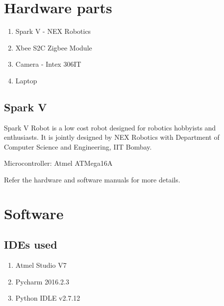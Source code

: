 \documentclass[main.tex]{subfiles}
\begin{document}
	\section{Hardware parts}
	\begin{enumerate}
		\item Spark V - NEX Robotics
		\item Xbee S2C Zigbee Module
		\item Camera - Intex 306IT 
		\item Laptop
	\end{enumerate}
	
	\subsection*{Spark V}
	\begin{flushleft}
		Spark V Robot \href{http://www.nex-robotics.com/products/spark-v-robot/spark-v.html}{\ExternalLink} is a low cost robot designed for robotics hobbyists and enthusiasts. It is jointly designed by NEX Robotics with Department of Computer Science and Engineering, IIT Bombay.
		
		Microcontroller: Atmel ATMega16A
		
		Refer the hardware \href{./datasheet/Spark V manuals/SPARK V ATMEGA16 Hardware Manual 2010-11-06.pdf}{\ExternalLink} and software\href{./datasheet/Spark V manuals/SPARK V ATMEGA16 Hardware Manual 2010-11-06.pdf}{\ExternalLink} manuals for more details.
	\end{flushleft}
	
	\section{Software}
	\subsection{IDEs used}
	\begin{enumerate}
		\item Atmel Studio V7 \href{http://www.atmel.com/microsite/atmel-studio/}{\ExternalLink}
		\item Pycharm 2016.2.3 \href{https://www.jetbrains.com/pycharm/download/#section=windows}{\ExternalLink}  
		\item Python IDLE v2.7.12
	\end{enumerate}			
	
\end{document}
